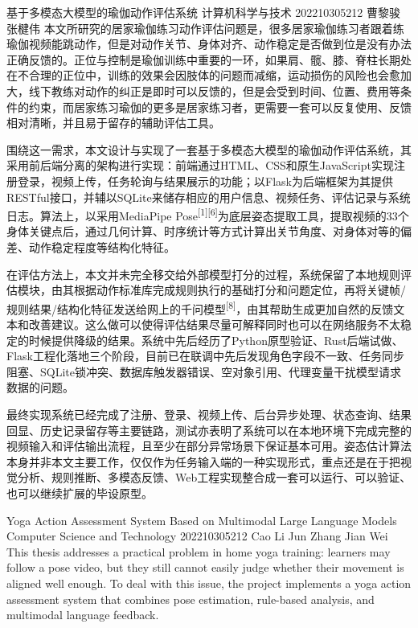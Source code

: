 \makeChineseAbstractHeader
  {基于多模态大模型的瑜伽动作评估系统}
  {计算机科学与技术}
  {202210305212}
  {曹黎骏}
  {张楗伟}
\ChineseAbstractTextStart
本文所研究的居家瑜伽练习动作评估问题是，很多居家瑜伽练习者跟着练瑜伽视频能跳动作，但是对动作关节、身体对齐、动作稳定是否做到位是没有办法正确反馈的。正位与控制是瑜伽训练中重要的一环，如果肩、髋、膝、脊柱长期处在不合理的正位中，训练的效果会因肢体的问题而减缩，运动损伤的风险也会愈加大，线下教练对动作的纠正是即时可以反馈的，但是会受到时间、位置、费用等条件的约束，而居家练习瑜伽的更多是居家练习者，更需要一套可以反复使用、反馈相对清晰，并且易于留存的辅助评估工具。

围绕这一需求，本文设计与实现了一套基于多模态大模型的瑜伽动作评估系统，其采用前后端分离的架构进行实现：前端通过HTML、CSS和原生JavaScript实现注册登录，视频上传，任务轮询与结果展示的功能；以Flask为后端框架为其提供RESTful接口，并辅以SQLite来储存相应的用户信息、视频任务、评估记录与系统日志。算法上，以采用MediaPipe Pose\textsuperscript{[1][6]}为底层姿态提取工具，提取视频的33个身体关键点后，通过几何计算、时序统计等方式计算出关节角度、对身体对等的偏差、动作稳定程度等结构化特征。

在评估方法上，本文并未完全移交给外部模型打分的过程，系统保留了本地规则评估模块，由其根据动作标准库完成规则执行的基础打分和问题定位，再将关键帧/规则结果/结构化特征发送给网上的千问模型\textsuperscript{[8]}，由其帮助生成更加自然的反馈文本和改善建议。这么做可以使得评估结果尽量可解释同时也可以在网络服务不太稳定的时候提供降级的结果。系统中先后经历了Python原型验证、Rust后端试做、Flask工程化落地三个阶段，目前已在联调中先后发现角色字段不一致、任务同步阻塞、SQLite锁冲突、数据库触发器错误、空对象引用、代理变量干扰模型请求数据的问题。

最终实现系统已经完成了注册、登录、视频上传、后台异步处理、状态查询、结果回显、历史记录留存等主要链路，测试亦表明了系统可以在本地环境下完成完整的视频输入和评估输出流程，且至少在部分异常场景下保证基本可用。姿态估计算法本身并非本文主要工作，仅仅作为任务输入端的一种实现形式，重点还是在于把视觉分析、规则推断、多模态反馈、Web工程实现整合成一套可以运行、可以验证、也可以继续扩展的毕设原型。
\ChineseAbstractTextFinish
{}

\makeEnglishAbstractHeader
  {Yoga Action Assessment System Based on Multimodal Large Language Models}
  {Computer Science and Technology}
  {202210305212}
  {Cao Li Jun}
  {Zhang Jian Wei}
\EnglishAbstractTextStart
This thesis addresses a practical problem in home yoga training: learners may follow a pose video, but they still cannot easily judge whether their movement is aligned well enough. To deal with this issue, the project implements a yoga action assessment system that combines pose estimation, rule-based analysis, and multimodal language feedback.

